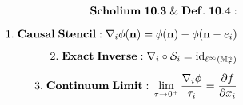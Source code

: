 \documentclass[preview]{standalone}
\begin{document}
\begin{align*}
\special{dvisvgm:raw <g id='unique000'>}\mathbf{Scholium\;10.3\;\&\;Def.\;10.4:}\\[6pt]1.\;\mathbf{Causal\;Stencil:}\;\nabla_i\phi(\mathbf{n}) = \phi(\mathbf{n}) - \phi(\mathbf{n}-e_i)\\[5pt]2.\;\mathbf{Exact\;Inverse:}\;\nabla_i \circ \mathcal{S}_i = \operatorname{id}_{\ell^\infty(\mathbb{M}_\tau^n)}\\[5pt]3.\;\mathbf{Continuum\;Limit:}\;\lim_{\tau\to 0^+}\frac{\nabla_i\phi}{\tau_i} = \frac{\partial f}{\partial x_i}\special{dvisvgm:raw </g>}
\end{align*}
\end{document}
